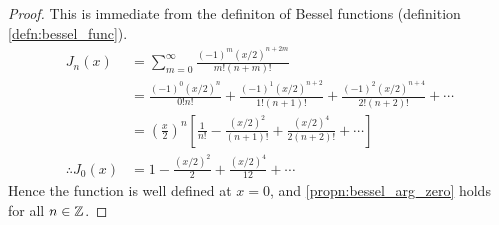   \begin{proof}
    This is immediate from the definiton of Bessel functions (definition \ref{defn:bessel_func}).
      \begin{align*}
        J_n(x)
          &= \sum^\infty_{m=0} \frac{(-1)^m(x/2)^{n+2m}}{m! (n+m)!}\\
          &= \frac{(-1)^0(x/2)^{n}}{0!n!}         %
            + \frac{(-1)^1(x/2)^{n+2}}{1!(n+1)!}  %
            + \frac{(-1)^2(x/2)^{n+4}}{2!(n+2)!}  %
            + \dotsb \\
          &= \left(\frac{x}{2}\right)^n
            \left[\frac{1}{n!}           %
            - \frac{(x/2)^{2}}{(n+1)!}   %
            + \frac{(x/2)^{4}}{2(n+2)!}  %
            + \dotsb \right]\\
        \therefore
        J_0(x)
          &= 1
            - \frac{(x/2)^{2}}{2}
            + \frac{(x/2)^{4}}{12} + \dotsb
      \end{align*}
    Hence the function is well defined at $x=0$, and \ref{propn:bessel_arg_zero} holds for all $n \in \mathbb{Z}$.
  \end{proof}
